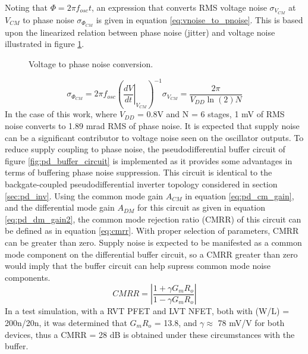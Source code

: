 		Noting that $\Phi = 2\pi f_{osc}t$, an expression that converts RMS voltage noise $\sigma_{V_{CM}}$ at $V_{CM}$ to phase noise $\sigma_{\Phi_{CM}}$ is given in equation \ref{eq:vnoise_to_pnoise}. This is based upon the linearized relation between phase noise (jitter) and voltage noise illustrated in figure \ref{fig:voltn_to_pn}.
			\begin{figure}[htb!]
			        \centering
			        
			    \caption{Voltage to phase noise conversion.}
			    \label{fig:voltn_to_pn}
			\end{figure}
			\begin{equation}\label{eq:vnoise_to_pnoise}
					\sigma_{\Phi_{CM}} = 2\pi f_{osc}\left(\left.\frac{dV}{dt}\right|_{V_{CM}}\right)^{-1}\sigma_{V_{CM}} = \frac{2\pi}{V_{DD}\ln(2)N} 
			\end{equation}
		In the case of this work, where $V_{DD}$ = 0.8V and N = 6 stages, 1 mV of RMS noise converts to 1.89 mrad RMS of phase noise. It is expected that supply noise can be a significant contributor to voltage noise seen on the oscillator outputs. To reduce supply coupling to phase noise, the pseudodifferential buffer circuit of figure \ref{fig:pd_buffer_circuit} is implemented as it provides some advantages in terms of buffering phase noise suppression. This circuit is identical to the backgate-coupled pseudodifferential inverter topology considered in section \ref{sec:pd_inv}. Using the common mode gain $A_{CM}$ in equation \ref{eq:pd_cm_gain}, and the differential mode gain $A_{DM}$ for this circuit as given in equation \ref{eq:pd_dm_gain2}, the common mode rejection ratio (CMRR) of this circuit can be defined as in equation \ref{eq:cmrr}. With proper selection of parameters, CMRR can be greater than zero. Supply noise is expected to be manifested as a common mode component on the differential buffer circuit, so a CMRR greater than zero would imply that the buffer circuit can help supress common mode noise components.
				\begin{equation}\label{eq:cmrr}
					CMRR = \left|\frac{1+\gamma G_m R_o}{1-\gamma G_m R_o}\right|
				\end{equation}
		In a test simulation, with a RVT PFET and LVT NFET, both with (W/L) = 200n/20n, it was determined that $G_m R_o$ = 13.8, and $\gamma\approx$ 78 mV/V for both devices, thus a CMRR = 28 dB is obtained under these circumstances with the buffer. 

		
